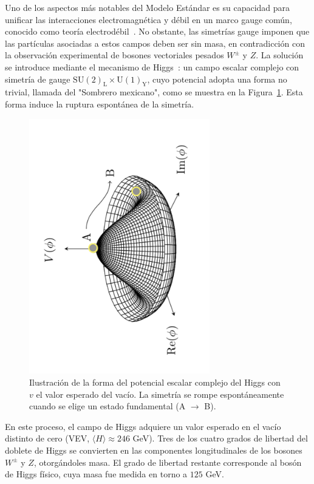 Uno de los aspectos más notables del Modelo Estándar es su capacidad para unificar las interacciones electromagnética y débil en un marco gauge común, conocido como teoría electrodébil~\cite{Glashow,Weinberg,Salam}. No obstante, las simetrías gauge imponen que las partículas asociadas a estos campos deben ser sin masa, en contradicción con la observación experimental de bosones vectoriales pesados \(W^\pm\) y \(Z\). La solución se introduce mediante el mecanismo de Higgs~\cite{Brout,HiggsSpontan}: un campo escalar complejo con simetría de gauge \(\mathrm{SU(2)_{L} \times U(1)_{Y}}\), cuyo potencial adopta una forma no trivial, llamada del "Sombrero mexicano", como se muestra en la Figura~\ref{res:mexican_hat}. Esta forma induce la ruptura espontánea de la simetría.  

\begin{figure}[htbp]
  \centering
  \includegraphics[angle=-90,width=0.7\textwidth]{images/mexican_hat.pdf}
  \caption{Ilustración de la forma del potencial escalar complejo del Higgs con $v$ el valor esperado del vacío. La simetría se rompe espontáneamente cuando se elige un estado fundamental (A $\rightarrow$ B).}
  \label{res:mexican_hat}
\end{figure}

En este proceso, el campo de Higgs adquiere un valor esperado en el vacío distinto de cero (VEV, \(\langle H \rangle \approx 246\) GeV). Tres de los cuatro grados de libertad del doblete de Higgs se convierten en las componentes longitudinales de los bosones \(W^\pm\) y \(Z\), otorgándoles masa. El grado de libertad restante corresponde al bosón de Higgs físico, cuya masa fue medida en torno a \(125\) GeV.  

